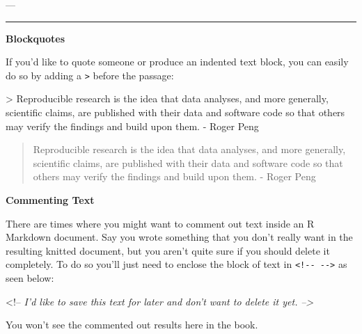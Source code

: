 \documentclass[]{tufte-book}
\newenvironment{Shaded}{\begin{snugshade}}{\end{snugshade}}
\newcommand{\DataTypeTok}[1]{\textcolor[rgb]{0.13,0.29,0.53}{{#1}}}
\newcommand{\CommentTok}[1]{\textcolor[rgb]{0.56,0.35,0.01}{\textit{{#1}}}}
\newcommand{\NormalTok}[1]{{#1}}
\theoremstyle{definition}
\theoremstyle{definition}
\theoremstyle{remark}
\begin{document}
\begin{Shaded}
\begin{Highlighting}[]
\NormalTok{---}
\end{Highlighting}
\end{Shaded}

\begin{center}\rule{0.5\linewidth}{\linethickness}\end{center}

\textbf{Blockquotes}

If you'd like to quote someone or produce an indented text block, you
can easily do so by adding a \texttt{\textgreater{}} before the passage:

\begin{Shaded}
\begin{Highlighting}[]
\NormalTok{>}\DataTypeTok{ Reproducible research is the idea that data analyses, and more generally, }
\DataTypeTok{scientific claims, are published with their data and software code so that}
\DataTypeTok{others may verify the findings and build upon them. - Roger Peng}
\end{Highlighting}
\end{Shaded}

\begin{quote}
Reproducible research is the idea that data analyses, and more
generally, scientific claims, are published with their data and software
code so that others may verify the findings and build upon them. - Roger
Peng
\end{quote}

\textbf{Commenting Text}

There are times where you might want to comment out text inside an R
Markdown document. Say you wrote something that you don't really want in
the resulting knitted document, but you aren't quite sure if you should
delete it completely. To do so you'll just need to enclose the block of
text in \texttt{\textless{}!-\/-\ -\/-\textgreater{}} as seen below:

\begin{Shaded}
\begin{Highlighting}[]
\NormalTok{<!--}
\CommentTok{I'd like to save this text for later and don't want to delete it yet.}
\CommentTok{-->}
\end{Highlighting}
\end{Shaded}

You won't see the commented out results here in the book.

\vspace*{0.2in}
\end{document}
